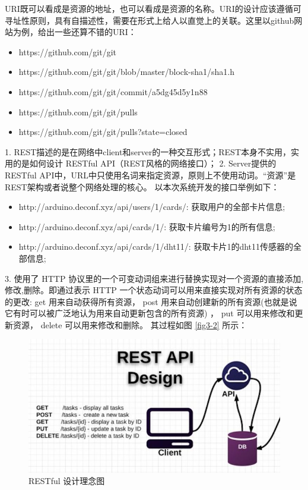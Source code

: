 URI既可以看成是资源的地址，也可以看成是资源的名称。URI的设计应该遵循可寻址性原则，具有自描述性，需要在形式上给人以直觉上的关联。这里以github网站为例，给出一些还算不错的URI：
\begin{itemize}
	\item https://github.com/git/git
	\item https://github.com/git/git/blob/master/block-sha1/sha1.h
	\item https://github.com/git/git/commit/a5dg45d5y1n88
	\item https://github.com/git/git/pulls
	\item https://github.com/git/git/pulls?state=closed
\end{itemize}

1. REST描述的是在网络中client和server的一种交互形式；REST本身不实用，实用的是如何设计 RESTful API（REST风格的网络接口）；
2. Server提供的RESTful API中，URL中只使用名词来指定资源，原则上不使用动词。“资源”是REST架构或者说整个网络处理的核心。
以本次系统开发的接口举例如下：
\begin{itemize}
	\item http://arduino.deconf.xyz/api/users/1/cards/: 获取用户的全部卡片信息; 
	\item http://arduino.deconf.xyz/api/cards/1/: 获取卡片编号为1的所有信息;
	\item http://arduino.deconf.xyz/api/cards/1/dht11/: 获取卡片1的dht11传感器的全部信息;
\end{itemize}

3. 使用了 HTTP 协议里的一个可变动词组来进行替换实现对一个资源的直接添加,修改,删除。即通过表示 HTTP 一个状态动词可以用来直接实现对所有资源的状态的更改:
get 用来自动获得所有资源，
post 用来自动创建新的所有资源(也就是说它有时可以被广泛地认为用来自动更新包含的所有资源)
， put 可以用来修改和更新资源，
delete 可以用来修改和删除。
其过程如图 \ref{fig3-2} 所示：
\begin{figure}[H]
	\centering
	\includegraphics[width=0.85\linewidth]{figure/3-2}
	\caption{RESTful 设计理念图}
	\label{fig:3-2}
\end{figure}

